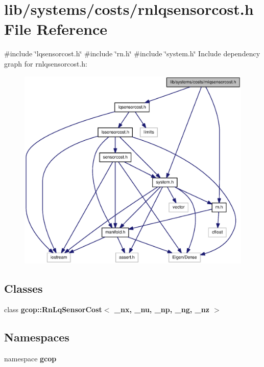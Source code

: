 \section{lib/systems/costs/rnlqsensorcost.h \-File \-Reference}
\label{rnlqsensorcost_8h}
{\ttfamily \#include \char`\"{}lqsensorcost.\-h\char`\"{}}\*
{\ttfamily \#include \char`\"{}rn.\-h\char`\"{}}\*
{\ttfamily \#include \char`\"{}system.\-h\char`\"{}}\*
\-Include dependency graph for rnlqsensorcost.\-h\-:
\nopagebreak
\begin{figure}[H]
\begin{center}
\leavevmode
\includegraphics[width=350pt]{rnlqsensorcost_8h__incl}
\end{center}
\end{figure}
\subsection*{\-Classes}
\begin{DoxyCompactItemize}
\item 
class {\bf gcop\-::\-Rn\-Lq\-Sensor\-Cost$<$ \-\_\-nx, \-\_\-nu, \-\_\-np, \-\_\-ng, \-\_\-nz $>$}
\end{DoxyCompactItemize}
\subsection*{\-Namespaces}
\begin{DoxyCompactItemize}
\item 
namespace {\bf gcop}
\end{DoxyCompactItemize}
